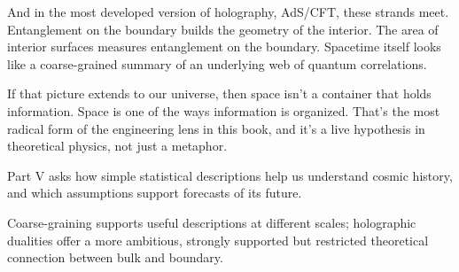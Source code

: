 And in the most developed version of holography, AdS/CFT, these strands meet. Entanglement on the boundary builds the geometry of the interior. The area of interior surfaces measures entanglement on the boundary. Spacetime itself looks like a coarse-grained summary of an underlying web of quantum correlations.

If that picture extends to our universe, then space isn't a container that holds information. Space is one of the ways information is organized. That's the most radical form of the engineering lens in this book, and it's a live hypothesis in theoretical physics, not just a metaphor.

Part V asks how simple statistical descriptions help us understand cosmic history, and which assumptions support forecasts of its future.

\begin{keytakeawaybox}
Coarse-graining supports useful descriptions at different scales; holographic dualities offer a more ambitious, strongly supported but restricted theoretical connection between bulk and boundary.
\end{keytakeawaybox}
